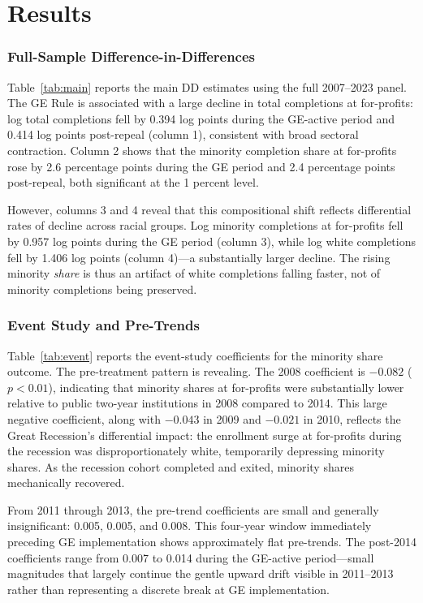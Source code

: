 \documentclass[12pt]{article}
\begin{document}
\section{Results}

\subsubsection*{Full-Sample Difference-in-Differences} Table~\ref{tab:main} reports the main DD estimates using the full 2007--2023 panel. The GE Rule is associated with a large decline in total completions at for-profits: log total completions fell by 0.394 log points during the GE-active period and 0.414 log points post-repeal (column 1), consistent with broad sectoral contraction. Column 2 shows that the minority completion share at for-profits rose by 2.6 percentage points during the GE period and 2.4 percentage points post-repeal, both significant at the 1 percent level.

However, columns 3 and 4 reveal that this compositional shift reflects differential rates of decline across racial groups. Log minority completions at for-profits fell by 0.957 log points during the GE period (column 3), while log white completions fell by 1.406 log points (column 4)---a substantially larger decline. The rising minority \textit{share} is thus an artifact of white completions falling faster, not of minority completions being preserved.



\subsubsection*{Event Study and Pre-Trends} Table~\ref{tab:event} reports the event-study coefficients for the minority share outcome. The pre-treatment pattern is revealing. The 2008 coefficient is $-0.082$ ($p < 0.01$), indicating that minority shares at for-profits were substantially lower relative to public two-year institutions in 2008 compared to 2014. This large negative coefficient, along with $-0.043$ in 2009 and $-0.021$ in 2010, reflects the Great Recession's differential impact: the enrollment surge at for-profits during the recession was disproportionately white, temporarily depressing minority shares. As the recession cohort completed and exited, minority shares mechanically recovered.

From 2011 through 2013, the pre-trend coefficients are small and generally insignificant: 0.005, 0.005, and 0.008. This four-year window immediately preceding GE implementation shows approximately flat pre-trends. The post-2014 coefficients range from 0.007 to 0.014 during the GE-active period---small magnitudes that largely continue the gentle upward drift visible in 2011--2013 rather than representing a discrete break at GE implementation.
\end{document}
